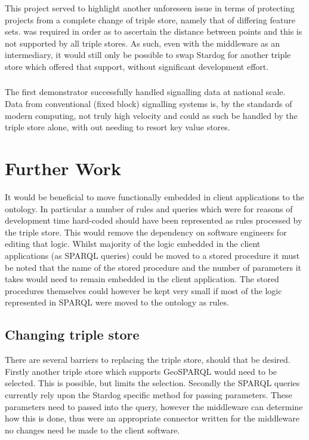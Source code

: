 This project served to highlight another unforeseen issue in terms of protecting projects from a complete change of triple store, namely that of differing feature sets. was required in order as to ascertain the distance between points and this is not supported by all triple stores. As such, even with the middleware as an intermediary, it would still only be possible to swap Stardog for another triple store which offered that support, without significant development effort. 

\begin{minipage}{\textwidth}
\subsubsection*{\textit{\QuestionCanOntologyScale}}
The first demonstrator successfully handled signalling data at national scale. Data from conventional (fixed block) signalling systems is, by the standards of modern computing, not truly high velocity and could as such be handled by the triple store alone, with out needing to resort key value stores.
\end{minipage}



\section{Further Work}
It would be beneficial to move functionally embedded in client applications to the ontology. In particular a number of rules and queries which were for reasons of development time hard-coded should have been represented as rules processed by the triple store. This would remove the dependency on software engineers for editing that logic. Whilst majority of the logic embedded in the client applications (as SPARQL queries) could be moved to a stored procedure it must be noted that the name of the stored procedure and the number of parameters it takes would need to remain embedded in the client application. The stored procedures themselves could however be kept very small if most of the logic represented in SPARQL were moved to the ontology as rules.

\subsection{Changing triple store}
There are several barriers to replacing the triple store, should that be desired. Firstly another triple store which supports GeoSPARQL would need to be selected. This is possible, but limits the selection. Secondly the SPARQL queries currently rely upon the Stardog specific method for passing parameters. These parameters need to passed into the query, however the middleware can determine how this is done, thus were an appropriate connector written for the middleware no changes need be made to the client software.
